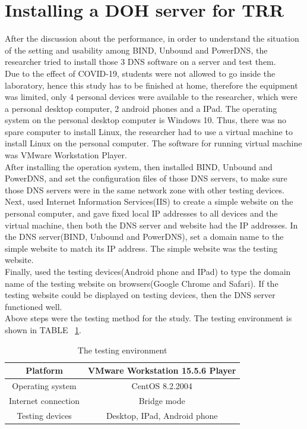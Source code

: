 \section{Installing a DOH server for TRR}

After the discussion about the performance, in order to understand the situation of the setting and usability among BIND, Unbound and PowerDNS, the researcher tried to install those 3 DNS software on a server and test them.
\\

Due to the effect of COVID-19, students were not allowed to go inside the laboratory, hence this study has to be finished at home, therefore the equipment was limited, only 4 personal devices were available to the researcher, which were a personal desktop computer, 2 android phones and a IPad. The operating system on the personal desktop computer is Windows 10. Thus, there was no spare computer to install Linux, the researcher had to use a virtual machine to install Linux on the personal computer. The software for running virtual machine was VMware Workstation Player.
\\

After installing the operation system, then installed BIND, Unbound and PowerDNS, and set the configuration files of those DNS servers, to make sure those DNS servers were in the same network zone with other testing devices.
\\

Next, used Internet Information Services(IIS) to create a simple website on the personal computer, and gave fixed local IP addresses to all devices and the virtual machine, then both the DNS server and website had the IP addresses. In the DNS server(BIND, Unbound and PowerDNS), set a domain name to the simple website to match its IP address. The simple website was the testing website.
\\

Finally, used the testing devices(Android phone and IPad) to type the domain name of the testing website on browsers(Google Chrome and Safari). If the testing website could be displayed on testing devices, then the DNS server functioned well. \\

Above steps were the testing method for the study. The testing environment is shown in TABLE ~\ref{tab:Testing_environment}.

\begin{table}[hbt!]
    \centering
    \begin{tabular}{|c|c|}
        \hline
         Platform & VMware Workstation 15.5.6 Player \\    
        \hline
         Operating system & CentOS 8.2.2004 \\
        \hline
         Internet connection & Bridge mode \\
        \hline
         Testing devices & Desktop, IPad, Android phone\\
        \hline
    \end{tabular}
    \caption{The testing environment}
    \label{tab:Testing_environment}
\end{table}

